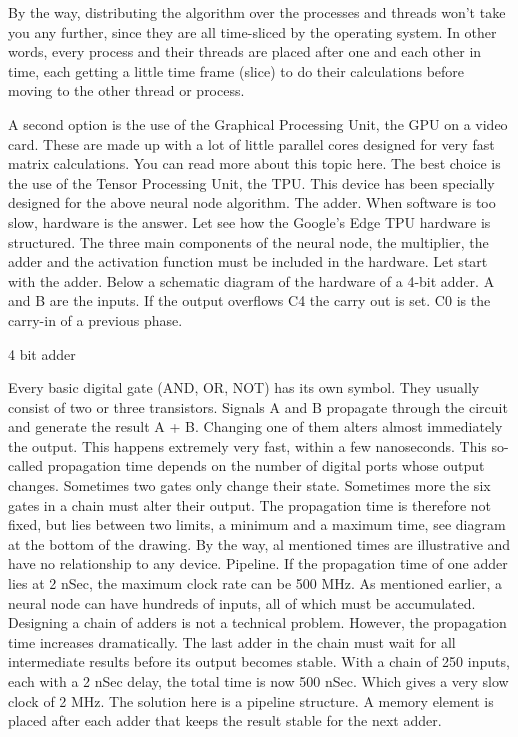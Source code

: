 By the way, distributing the algorithm over the processes and threads won't take you any further, since they are all time-sliced by the operating system. In other words, every process and their threads are placed after one and each other in time, each getting a little time frame (slice) to do their calculations before moving to the other thread or process.
 
A second option is the use of the Graphical Processing Unit, the GPU on a video card. These are made up with a lot of little parallel cores designed for very fast matrix calculations. You can read more about this topic here. The best choice is the use of the Tensor Processing Unit, the TPU. This device has been specially designed for the above neural node algorithm.
The adder.
When software is too slow, hardware is the answer. Let see how the Google's Edge TPU hardware is structured.
The three main components of the neural node, the multiplier, the adder and the activation function must be included in the hardware. Let start with the adder.
Below a schematic diagram of the hardware of a 4-bit adder. A and B are the inputs. If the output overflows C4 the carry out is set. C0 is the carry-in of a previous phase.

4 bit adder
 
Every basic digital gate (AND, OR, NOT) has its own symbol. They usually consist of two or three transistors. Signals A and B propagate through the circuit and generate the result A + B. Changing one of them alters almost immediately the output. This happens extremely very fast, within a few nanoseconds.
This so-called propagation time depends on the number of digital ports whose output changes. Sometimes two gates only change their state. Sometimes more the six gates in a chain must alter their output. The propagation time is therefore not fixed, but lies between two limits, a minimum and a maximum time, see diagram at the bottom of the drawing. By the way, al mentioned times are illustrative and have no relationship to any device.
Pipeline.
If the propagation time of one adder lies at 2 nSec, the maximum clock rate can be 500 MHz. As mentioned earlier, a neural node can have hundreds of inputs, all of which must be accumulated. Designing a chain of adders is not a technical problem. However, the propagation time increases dramatically. The last adder in the chain must wait for all intermediate results before its output becomes stable. With a chain of 250 inputs, each with a 2 nSec delay, the total time is now 500 nSec. Which gives a very slow clock of 2 MHz. The solution here is a pipeline structure. A memory element is placed after each adder that keeps the result stable for the next adder.


